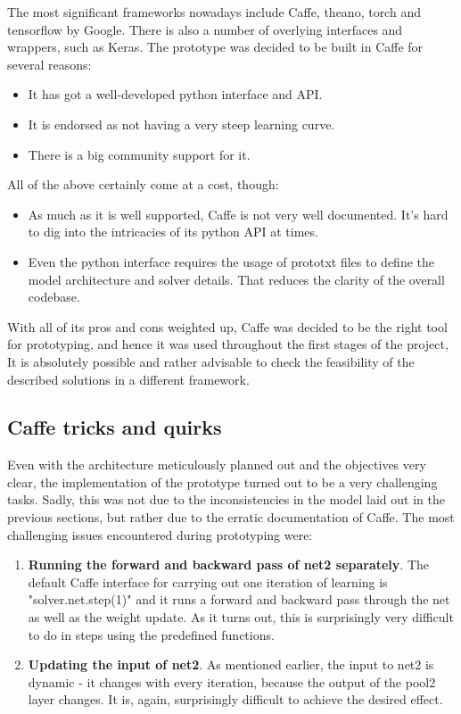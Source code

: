 \documentclass[a4paper, 11pt]{article}
\numberwithin{equation}{section}
\begin{document}
	The most significant frameworks nowadays include Caffe, theano, torch and tensorflow by Google. There is also a number of overlying interfaces and wrappers, such as Keras. The prototype was decided to be built in Caffe for several reasons:
	
	\begin{itemize}
		\item It has got a well-developed python interface and API.
		\item It is endorsed as not having a very steep learning curve.
		\item There is a big community support for it.
	\end{itemize}
	
	All of the above certainly come at a cost, though:
	
	\begin{itemize}
		\item As much as it is well supported, Caffe is not very well documented. It's hard to dig into the intricacies of its python API at times.
		\item Even the python interface requires the usage of prototxt files to define the model architecture and solver details. That reduces the clarity of the overall codebase.
	\end{itemize}
	
	With all of its pros and cons weighted up, Caffe was decided to be the right tool for prototyping, and hence it was used throughout the first stages of the project, It is absolutely possible and rather advisable to check the feasibility of the described solutions in a different framework.
	
	\subsection{Caffe tricks and quirks}
	
	Even with the architecture meticulously planned out and the objectives very clear, the implementation of the prototype turned out to be a very challenging tasks. Sadly, this was not due to the inconsistencies in the model laid out in the previous sections, but rather due to the erratic documentation of Caffe. The most challenging issues encountered during prototyping were:
	
	\begin{enumerate}
		\item \textbf{Running the forward and backward pass of net2 separately}. The default Caffe interface for carrying out one iteration of learning is "solver.net.step(1)" and it runs a forward and backward pass through the net as well as the weight update. As it turns out, this is surprisingly very difficult to do in steps using the predefined functions.
		\item \textbf{Updating the input of net2}. As mentioned earlier, the input to net2 is dynamic - it changes with every iteration, because the output of the pool2 layer changes. It is, again, surprisingly difficult to achieve the desired effect.
	\end{enumerate}
	
\end{document}
